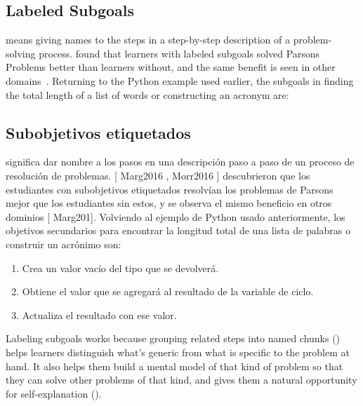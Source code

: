 \subsection*{Labeled Subgoals}

 means
giving names to the steps in a step-by-step description of a problem-solving process.
\cite{Marg2016,Morr2016} found that learners with labeled subgoals
solved Parsons Problems better than learners without,
and the same benefit is seen in other domains~\cite{Marg2012}.
Returning to the Python example used earlier,
the subgoals in finding the total length of a list of words or constructing an acronym are:

\subsection*{Subobjetivos etiquetados}
 
  significa 
dar nombre a los pasos en una descripción paso a paso de un proceso de resolución de problemas. 
[ Marg2016 , Morr2016 ] descubrieron que los estudiantes con subobjetivos etiquetados 
resolvían los problemas de Parsons mejor que los estudiantes sin estos, 
y se observa el mismo beneficio en otros dominios [ Marg201]. 
Volviendo al ejemplo de Python usado anteriormente, 
los objetivos secundarios para encontrar la longitud total de una lista de palabras o construir un acrónimo son:

\begin{enumerate}

\item
  Crea un valor vacío del tipo que se devolverá.

\item
  Obtiene el valor que se agregará al resultado de la variable de ciclo.

\item
  Actualiza el resultado con ese valor.

\end{enumerate}

Labeling subgoals works because grouping related steps into named chunks ()
helps learners distinguish what's generic from what is specific to the problem at hand.
It also helps them build a mental model of that kind of problem
so that they can solve other problems of that kind,
and gives them a natural opportunity for self-explanation ().

